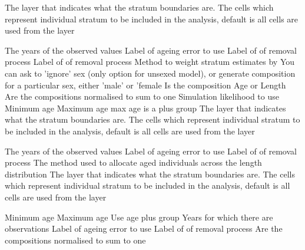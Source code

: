  {The layer that indicates what the stratum boundaries are.}
 {The cells which represent individual stratum to be included in the analysis, default is all cells are used from the layer}
\par\textbf{}\par
{} {The years of the observed values}
 {Label of ageing error to use}
 {Label of of removal process}
 {Label of of removal process}
 {Method to weight stratum estimates by}
 {You can ask to 'ignore' sex (only option for unsexed model), or generate composition for a particular sex, either 'male' or 'female}
 {Is the composition Age or Length}
 {Are the compositions normalised to sum to one}
 {Simulation likelihood to use}
 {Minimum age}
 {Maximum age}
 {max age is a plus group}
 {The layer that indicates what the stratum boundaries are.}
 {The cells which represent individual stratum to be included in the analysis, default is all cells are used from the layer}
\par\textbf{}\par
{} {The years of the observed values}
 {Label of ageing error to use}
 {Label of of removal process}
 {The method used to allocate aged individuals across the length distribution}
 {The layer that indicates what the stratum boundaries are.}
 {The cells which represent individual stratum to be included in the analysis, default is all cells are used from the layer}
\par\textbf{}\par
{} {Minimum age}
 {Maximum age}
 {Use age plus group}
 {Years for which there are observations}
 {Label of ageing error to use}
 {Label of of removal process}
 {Are the compositions normalised to sum to one}
